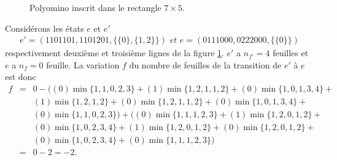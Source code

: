  \begin{Ex}\label{exdec141}
 \begin{figure}[!htb]
\begin{minipage}[c]{.26\linewidth}
        \centering
\end{minipage}
\hfill
\begin{minipage}[c]{.64\linewidth}
        \centering
\begin{logicpuzzle}[rows=5,columns=7,color=cyan!100, width=750px,scale=0.5]
\framepuzzle[black!50]
\end{logicpuzzle}
\end{minipage}
\caption{\label{Atfig9} Polyomino inscrit dans le rectangle $7\times 5$.}
\end{figure} 
Considérons les états $e$ et  $e'$ 
\begin{eqnarray*}
e' =(1101101,1101201,\{\{0\},\{1,2\} \}) \textit{ et } e=(0111000,0222000,\{\{0\}\})
\end{eqnarray*}
respectivement deuxième et troisième lignes de la figure \ref{Atfig9}.
$e'$ a $n_{f'}=4$ feuilles et $e$ a $n_{f}=0$ feuille. La variation $f$ du nombre de feuilles de la transition de  $e'$ à $e$ est donc
\begin{eqnarray*}
f & = & 0 -((0)\min\{1,1,0,2,3\} +(1)\min\{1,2,1,1,2\}+(0)\min\{1,0,1,3,4\}+\\
& &  (1)\min\{1,2,1,2\}+(0)\min\{1,2,1,1,2\}+ (0)\min\{1,0,1,3,4\}+\\
& & (0)\min\{1,1,0,2,3\}) + ((0)\min\{1,1,1,2,3\} +(1)\min\{1,2,0,1,2\}+\\
& & (0)\min\{1,0,2,3,4\}+(1)\min\{1,2,0,1,2\}+(0)\min\{1,2,0,1,2\}+\\
& & (0)\min\{1,0,2,3,4\}+(0)\min\{1,1,1,2,3\})\\
& = & 0-2=-2.
\end{eqnarray*}
\end{Ex}

